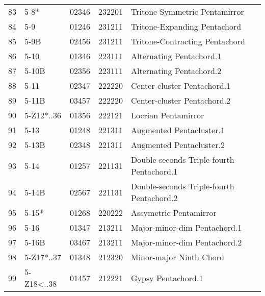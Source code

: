 \begin{table}[h]
\begin{tabular}{lllll}
83 & 5-8*                           & 02346 & 232201          & Tritone-Symmetric Pentamirror                     \\
84 & 5-9                            & 01246 & 231211          & Tritone-Expanding Pentachord                      \\
85 & 5-9B                           & 02456 & 231211          & Tritone-Contracting Pentachord                    \\
86 & 5-10                           & 01346 & 223111          & Alternating Pentachord.1                          \\
87 & 5-10B                          & 02356 & 223111          & Alternating Pentachord.2                          \\
88 & 5-11                           & 02347 & 222220          & Center-cluster Pentachord.1                       \\
89 & 5-11B                          & 03457 & 222220          & Center-cluster Pentachord.2                       \\
90 & 5-Z12*..36                     & 01356 & 222121          & Locrian Pentamirror                               \\
91 & 5-13                           & 01248 & 221311          & Augmented Pentacluster.1                          \\
92 & 5-13B                          & 02348 & 221311          & Augmented Pentacluster.2                          \\
93 & 5-14                           & 01257 & 221131          & Double-seconds Triple-fourth Pentachord.1         \\
94 & 5-14B                          & 02567 & 221131          & Double-seconds Triple-fourth Pentachord.2         \\
95 & 5-15*                          & 01268 & 220222          & Assymetric Pentamirror                            \\
96 & 5-16                           & 01347 & 213211          & Major-minor-dim Pentachord.1                      \\
97 & 5-16B                          & 03467 & 213211          & Major-minor-dim Pentachord.2                      \\
98 & 5-Z17*..37                     & 01348 & 212320          & Minor-major Ninth Chord                           \\
99 & 5-Z18\textless..38             & 01457 & 212221          & Gypsy Pentachord.1                               


\end{tabular}
\end{table}
